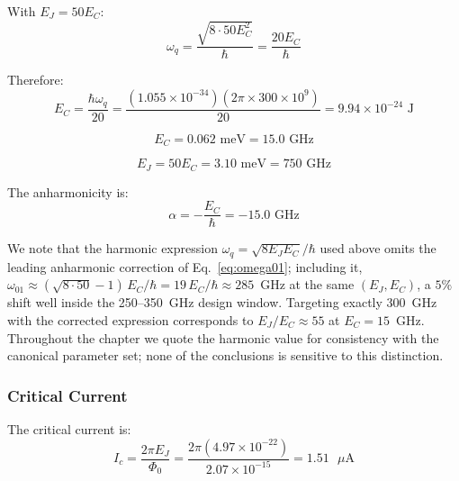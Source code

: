 With $E_J = 50 E_C$:
\begin{equation}
\omega_q = \frac{\sqrt{8 \cdot 50 E_C^2}}{\hbar} = \frac{20 E_C}{\hbar}
\end{equation}

Therefore:
\begin{equation}
E_C = \frac{\hbar \omega_q}{20} = \frac{(1.055 \times 10^{-34})(2\pi \times 300 \times 10^9)}{20} = \boxed{9.94 \times 10^{-24} \text{ J}}
\end{equation}

\begin{equation}
E_C = \boxed{0.062 \text{ meV} = 15.0 \text{ GHz}}
\end{equation}

\begin{equation}
E_J = 50 E_C = \boxed{3.10 \text{ meV} = 750 \text{ GHz}}
\end{equation}

The anharmonicity is:
\begin{equation}
\alpha = -\frac{E_C}{\hbar} = \boxed{-15.0 \text{ GHz}}
\end{equation}

We note that the harmonic expression $\omega_q = \sqrt{8E_JE_C}/\hbar$ used
above omits the leading anharmonic correction of Eq.~\eqref{eq:omega01};
including it, $\omega_{01} \approx (\sqrt{8 \cdot 50}-1)\,E_C/\hbar = 19\,E_C/\hbar
\approx 285$~GHz at the same $(E_J, E_C)$, a $5\%$ shift well inside the
250--350~GHz design window. Targeting exactly 300~GHz with the corrected
expression corresponds to $E_J/E_C \approx 55$ at $E_C = 15$~GHz. Throughout
the chapter we quote the harmonic value for consistency with the canonical
parameter set; none of the conclusions is sensitive to this distinction.

\subsubsection{Critical Current}
\label{sec:junction_design}

The critical current is:
\begin{equation}
I_c = \frac{2\pi E_J}{\Phi_0} = \frac{2\pi (4.97 \times 10^{-22})}{2.07 \times 10^{-15}} = \boxed{1.51 \text{ }\mu\text{A}}
\end{equation}

